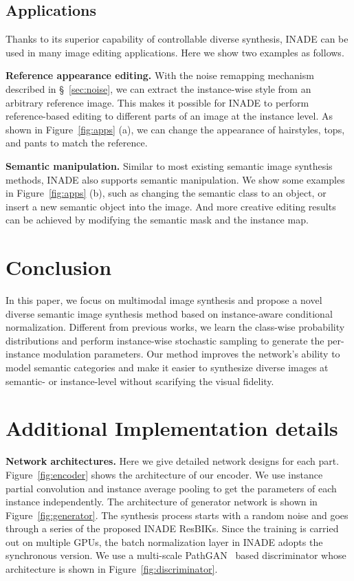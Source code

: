 \documentclass[final]{cvpr}
\begin{document}
\subsection{Applications}
Thanks to its superior capability of controllable diverse synthesis, INADE can be used in many image editing applications. Here we show two examples as follows.

\noindent\textbf{Reference appearance editing.} With the noise remapping mechanism described in \S~\ref{sec:noise}, we can extract the instance-wise style from an arbitrary reference image. This makes it possible for INADE to perform reference-based editing to different parts of an image at the instance level. As shown in Figure~\ref{fig:apps} (a), we can change the appearance of hairstyles, tops, and pants to match the reference. 

\noindent\textbf{Semantic manipulation.} Similar to most existing semantic image synthesis methods, INADE also supports semantic manipulation. We show some examples in Figure~\ref{fig:apps} (b), such as changing the semantic class to an object, or insert a new semantic object into the image. And more creative editing results can be achieved by modifying the semantic mask and the instance map.

\section{Conclusion}
In this paper, we focus on multimodal image synthesis and propose a novel diverse semantic image synthesis method based on instance-aware conditional normalization. Different from previous works, we learn the class-wise probability distributions and perform instance-wise stochastic sampling to generate the per-instance modulation parameters. Our method improves the network's ability to model semantic categories and make it easier to synthesize diverse images at semantic- or instance-level without scarifying the visual fidelity.


{\small


}
\newpage

\section{Additional Implementation details}
\noindent\textbf{Network architectures.} Here we give detailed network designs for each part. Figure~\ref{fig:encoder} shows the architecture of our encoder. We use instance partial convolution and instance average pooling to get the parameters of each instance independently. The architecture of generator network is shown in Figure~\ref{fig:generator}. The synthesis process starts with a random noise and goes through a series of the proposed INADE ResBIKs. Since the training is carried out on multiple GPUs, the batch normalization layer in INADE adopts the synchronous version. We use a multi-scale PathGAN~\cite{isola2017image} based discriminator whose architecture is shown in Figure~\ref{fig:discriminator}.
\end{document}
